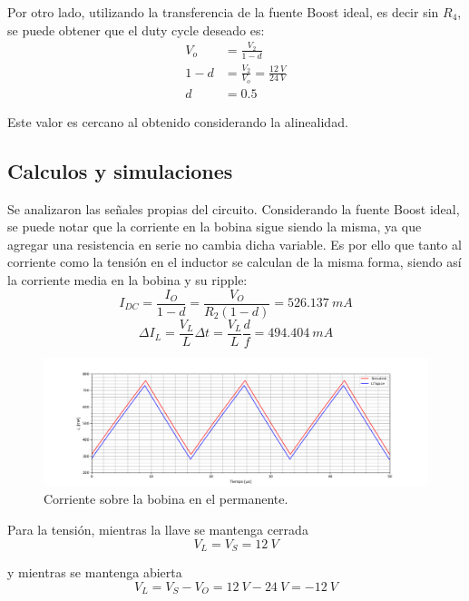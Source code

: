 Por otro lado, utilizando la transferencia de la fuente Boost ideal, es decir sin $R_4$, se puede obtener que el duty cycle deseado es:
\begin{align*}
V_o &= \frac{V_2}{1 - d}	\\
1 - d &= \frac{V_2}{V_o} = \frac{12 \ V}{24 \ V} \\
d &= 0.5
\end{align*}

Este valor es cercano al obtenido considerando la alinealidad.

\subsection{Calculos y simulaciones}

Se analizaron las señales propias del circuito. Considerando la fuente Boost ideal, se puede notar que la corriente en la bobina sigue siendo la misma, ya que agregar una resistencia en serie no cambia dicha variable. Es por ello que tanto al corriente como la tensión en el inductor se calculan de la misma forma, siendo así la corriente media en la bobina y su ripple:
\begin{equation*}
	I_{DC} = \frac{I_O}{1 - d} = \frac{V_O}{R_2 (1 - d)} = 526.137 \ mA
\end{equation*}
\begin{equation*}
	\Delta I_L = \frac{V_L}{L}\Delta t =  \frac{V_L}{L}  \frac{d}{f} = 494.404 \ mA  
\end{equation*}	%

\begin{figure}[H]
	\centering
	\includegraphics[width=0.9\linewidth]{ImagenesEjercicio-2/il.png}
	\caption{Corriente sobre la bobina en el permanente.}
	\label{fig:ej2:il}
\end{figure}

Para la tensión, mientras la llave se mantenga cerrada
\begin{equation*}
	V_L = V_S = 12 \ V
\end{equation*}

y mientras se mantenga abierta
\begin{equation*}
	V_L = V_S - V_O = 12 \ V - 24 \ V = -12 \ V
\end{equation*}


